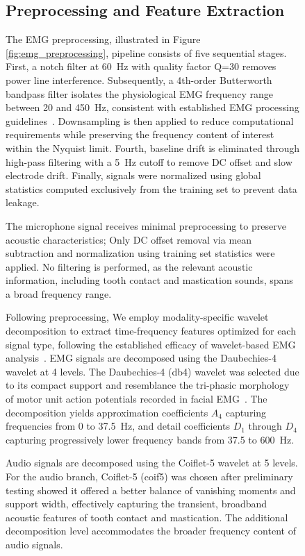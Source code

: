 \documentclass[pdflatex,sn-vancouver-num, iicol]{sn-jnl}
\begin{document}
\begin{figure}[h]
\subsection{Preprocessing and Feature Extraction}

The EMG preprocessing, illustrated in Figure \ref{fig:emg_preprocessing}, pipeline consists of five sequential stages. First, a notch filter at 60~Hz with quality factor Q=30 removes power line interference. Subsequently, a 4th-order Butterworth bandpass filter isolates the physiological EMG frequency range between 20 and 450~Hz, consistent with established EMG processing guidelines~\cite{chowdhury2013surface}. Downsampling is then applied to reduce computational requirements while preserving the frequency content of interest within the Nyquist limit. Fourth, baseline drift is eliminated through high-pass filtering with a 5~Hz cutoff to remove DC offset and slow electrode drift. Finally, signals were normalized using global statistics computed exclusively from the training set to prevent data leakage.

The microphone signal receives minimal preprocessing to preserve acoustic characteristics; Only DC offset removal via mean subtraction and normalization using training set statistics were applied. No filtering is performed, as the relevant acoustic information, including tooth contact and mastication sounds, spans a broad frequency range.



Following preprocessing, We employ modality-specific wavelet decomposition to extract time-frequency features optimized for each signal type, following the established efficacy of wavelet-based EMG analysis~\cite{phinyomark2012feature}. EMG signals are decomposed using the Daubechies-4 wavelet at 4 levels. 
The Daubechies-4 (db4) wavelet was selected due to its compact support and resemblance the tri-phasic morphology of motor unit action potentials recorded in facial EMG~\cite{englehart2003robust}. The decomposition yields approximation coefficients $A_4$ capturing frequencies from 0 to 37.5~Hz, and detail coefficients $D_1$ through $D_4$ capturing progressively lower frequency bands from 37.5 to 600~Hz.

Audio signals are decomposed using the Coiflet-5 wavelet at 5 levels. For the audio branch, Coiflet-5 (coif5) was chosen after preliminary testing showed it offered a better balance of vanishing moments and support width, effectively capturing the transient, broadband acoustic features of tooth contact and mastication. The additional decomposition level accommodates the broader frequency content of audio signals. \cite{bharathi2025unveiling}


\end{figure}
\end{document}
